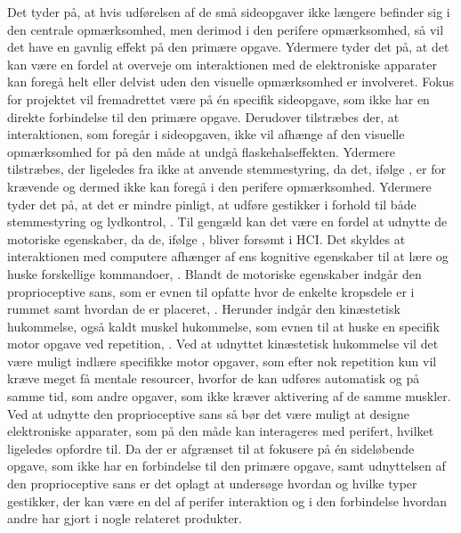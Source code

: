 Det tyder på, at hvis udførelsen af de små sideopgaver ikke længere befinder sig i den centrale opmærksomhed, men derimod i den perifere opmærksomhed, så vil det have en gavnlig effekt på den primære opgave. Ydermere tyder det på, at det kan være en fordel at overveje om interaktionen med de elektroniske apparater kan foregå helt eller delvist uden den visuelle opmærksomhed er involveret. Fokus for projektet vil fremadrettet være på én specifik sideopgave, som ikke har en direkte forbindelse til den primære opgave. Derudover tilstræbes der, at interaktionen, som foregår i sideopgaven, ikke vil afhænge af den visuelle opmærksomhed for på den måde at undgå flaskehalseffekten. Ydermere tilstræbes, der ligeledes fra ikke at anvende stemmestyring, da det, ifølge \textcite[s. 41]{PDF:PIEmbeddingHCIMicroManageMe}, er for krævende og dermed ikke kan foregå i den perifere opmærksomhed. Ydermere tyder det på, at det er mindre pinligt, at udføre gestikker i forhold til både stemmestyring og lydkontrol, \parencite[s. 4]{PDF:AnExploratoryStudy}. Til gengæld kan det være en fordel at udnytte de motoriske egenskaber, da de, ifølge \textcite[s. 187]{PDF:PIDesktopComputingKap9}, bliver forsømt i HCI. Det skyldes at interaktionen med computere afhænger af ens kognitive egenskaber til at lære og huske forskellige kommandoer, \parencite[s. 187]{PDF:PIDesktopComputingKap9}. Blandt de motoriske egenskaber indgår den proprioceptive sans, som er evnen til opfatte hvor de enkelte kropsdele er i rummet samt hvordan de er placeret, \parencite[s. 193]{PDF:PIDesktopComputingKap9}. Herunder indgår den kinæstetisk hukommelse, også kaldt muskel hukommelse, som evnen til at huske en specifik motor opgave ved repetition, \parencite[s. 193]{PDF:PIDesktopComputingKap9}. Ved at udnyttet kinæstetisk hukommelse vil det være muligt indlære specifikke motor opgaver, som efter nok repetition kun vil kræve meget få mentale resourcer, hvorfor de kan udføres automatisk og på samme tid, som andre opgaver, som ikke kræver aktivering af de samme muskler. Ved at udnytte den proprioceptive sans så bør det være muligt at designe elektroniske apparater, som på den måde kan interageres med perifert, hvilket \textcite[s. 202]{PDF:PIDesktopComputingKap9} ligeledes opfordre til.\blankline
%
Da der er afgrænset til at fokusere på én sideløbende opgave, som ikke har en forbindelse til den primære opgave, samt udnyttelsen af den proprioceptive sans er det oplagt at undersøge hvordan og hvilke typer gestikker, der kan være en del af perifer interaktion og i den forbindelse hvordan andre har gjort i nogle relateret produkter.      
 